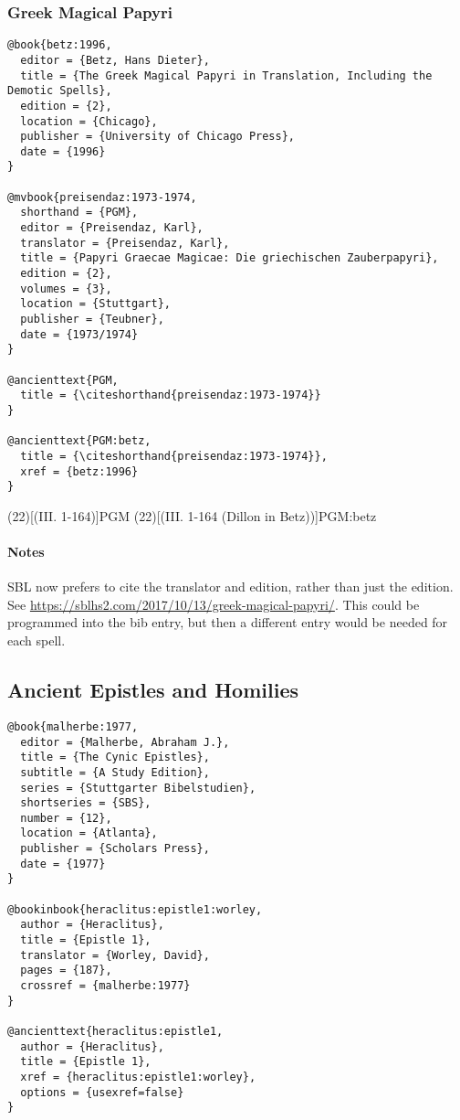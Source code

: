 \documentclass[a4paper]{article}
\begin{document}
\newrefsection

\subsubsection{Greek Magical Papyri}

\begin{verbatim}
@book{betz:1996,
  editor = {Betz, Hans Dieter},
  title = {The Greek Magical Papyri in Translation, Including the Demotic Spells},
  edition = {2},
  location = {Chicago},
  publisher = {University of Chicago Press},
  date = {1996}
}

@mvbook{preisendaz:1973-1974,
  shorthand = {PGM},
  editor = {Preisendaz, Karl},
  translator = {Preisendaz, Karl},
  title = {Papyri Graecae Magicae: Die griechischen Zauberpapyri},
  edition = {2},
  volumes = {3},
  location = {Stuttgart},
  publisher = {Teubner},
  date = {1973/1974}
}

@ancienttext{PGM,
  title = {\citeshorthand{preisendaz:1973-1974}}
}

@ancienttext{PGM:betz,
  title = {\citeshorthand{preisendaz:1973-1974}},
  xref = {betz:1996}
}
\end{verbatim}

\nocite{preisendaz:1973-1974}
\examplecite(22)[(III. 1-164)]{PGM}
\examplecite(22)[(III. 1-164 \mkbibparens{Dillon in Betz})]{PGM:betz}
\exampleabbreviations
\examplebibliography

\paragraph{Notes}

SBL now prefers to cite the translator and edition, rather than just the
edition. See \url{https://sblhs2.com/2017/10/13/greek-magical-papyri/}. This
could be programmed into the bib entry, but then a different entry would be
needed for each spell.

\subsection{Ancient Epistles and Homilies}

\begin{verbatim}
@book{malherbe:1977,
  editor = {Malherbe, Abraham J.},
  title = {The Cynic Epistles},
  subtitle = {A Study Edition},
  series = {Stuttgarter Bibelstudien},
  shortseries = {SBS},
  number = {12},
  location = {Atlanta},
  publisher = {Scholars Press},
  date = {1977}
}

@bookinbook{heraclitus:epistle1:worley,
  author = {Heraclitus},
  title = {Epistle 1},
  translator = {Worley, David},
  pages = {187},
  crossref = {malherbe:1977}
}

@ancienttext{heraclitus:epistle1,
  author = {Heraclitus},
  title = {Epistle 1},
  xref = {heraclitus:epistle1:worley},
  options = {usexref=false}
}
\end{verbatim}
\end{document}
